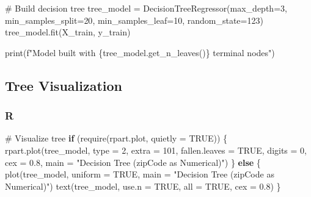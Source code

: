 \documentclass[
  letterpaper,
  DIV=11,
  numbers=noendperiod]{scrartcl}
\newenvironment{Shaded}{\begin{snugshade}}{\end{snugshade}}
\newcommand{\AttributeTok}[1]{\textcolor[rgb]{0.40,0.45,0.13}{#1}}
\newcommand{\BuiltInTok}[1]{\textcolor[rgb]{0.00,0.23,0.31}{#1}}
\newcommand{\CommentTok}[1]{\textcolor[rgb]{0.37,0.37,0.37}{#1}}
\newcommand{\ConstantTok}[1]{\textcolor[rgb]{0.56,0.35,0.01}{#1}}
\newcommand{\ControlFlowTok}[1]{\textcolor[rgb]{0.00,0.23,0.31}{\textbf{#1}}}
\newcommand{\DecValTok}[1]{\textcolor[rgb]{0.68,0.00,0.00}{#1}}
\newcommand{\FloatTok}[1]{\textcolor[rgb]{0.68,0.00,0.00}{#1}}
\newcommand{\FunctionTok}[1]{\textcolor[rgb]{0.28,0.35,0.67}{#1}}
\newcommand{\NormalTok}[1]{\textcolor[rgb]{0.00,0.23,0.31}{#1}}
\newcommand{\OperatorTok}[1]{\textcolor[rgb]{0.37,0.37,0.37}{#1}}
\newcommand{\SpecialCharTok}[1]{\textcolor[rgb]{0.37,0.37,0.37}{#1}}
\newcommand{\SpecialStringTok}[1]{\textcolor[rgb]{0.13,0.47,0.30}{#1}}
\newcommand{\StringTok}[1]{\textcolor[rgb]{0.13,0.47,0.30}{#1}}
\begin{document}
\begin{Shaded}
\begin{Highlighting}[]
\CommentTok{\# Build decision tree}
\NormalTok{tree\_model }\OperatorTok{=}\NormalTok{ DecisionTreeRegressor(max\_depth}\OperatorTok{=}\DecValTok{3}\NormalTok{, }
\NormalTok{                                  min\_samples\_split}\OperatorTok{=}\DecValTok{20}\NormalTok{, }
\NormalTok{                                  min\_samples\_leaf}\OperatorTok{=}\DecValTok{10}\NormalTok{, }
\NormalTok{                                  random\_state}\OperatorTok{=}\DecValTok{123}\NormalTok{)}
\NormalTok{tree\_model.fit(X\_train, y\_train)}

\BuiltInTok{print}\NormalTok{(}\SpecialStringTok{f"Model built with }\SpecialCharTok{\{}\NormalTok{tree\_model}\SpecialCharTok{.}\NormalTok{get\_n\_leaves()}\SpecialCharTok{\}}\SpecialStringTok{ terminal nodes"}\NormalTok{)}
\end{Highlighting}
\end{Shaded}

\subsection{Tree Visualization}\label{tree-visualization}

\subsubsection{R}

\begin{Shaded}
\begin{Highlighting}[]
\CommentTok{\# Visualize tree}
\ControlFlowTok{if}\NormalTok{ (}\FunctionTok{require}\NormalTok{(rpart.plot, }\AttributeTok{quietly =} \ConstantTok{TRUE}\NormalTok{)) \{}
  \FunctionTok{rpart.plot}\NormalTok{(tree\_model, }
             \AttributeTok{type =} \DecValTok{2}\NormalTok{,}
             \AttributeTok{extra =} \DecValTok{101}\NormalTok{,}
             \AttributeTok{fallen.leaves =} \ConstantTok{TRUE}\NormalTok{,}
             \AttributeTok{digits =} \DecValTok{0}\NormalTok{,}
             \AttributeTok{cex =} \FloatTok{0.8}\NormalTok{,}
             \AttributeTok{main =} \StringTok{"Decision Tree (zipCode as Numerical)"}\NormalTok{)}
\NormalTok{\} }\ControlFlowTok{else}\NormalTok{ \{}
  \FunctionTok{plot}\NormalTok{(tree\_model, }\AttributeTok{uniform =} \ConstantTok{TRUE}\NormalTok{, }\AttributeTok{main =} \StringTok{"Decision Tree (zipCode as Numerical)"}\NormalTok{)}
  \FunctionTok{text}\NormalTok{(tree\_model, }\AttributeTok{use.n =} \ConstantTok{TRUE}\NormalTok{, }\AttributeTok{all =} \ConstantTok{TRUE}\NormalTok{, }\AttributeTok{cex =} \FloatTok{0.8}\NormalTok{)}
\NormalTok{\}}
\end{Highlighting}
\end{Shaded}
\end{document}
